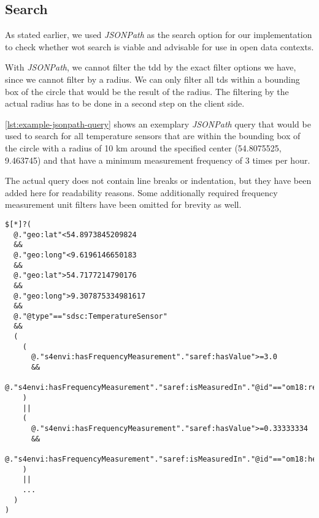 \subsection{Search}\label{sec:search}

As stated earlier, we used \emph{JSONPath} as the search option for our implementation to check whether \gls{wot} search is viable and advisable for use in open data contexts.

With \emph{JSONPath}, we cannot filter the \gls{tdd} by the exact filter options we have, since we cannot filter by a radius. We can only filter all \glspl{td} within a bounding box of the circle that would be the result of the radius. The filtering by the actual radius has to be done in a second step on the client side.

\autoref{lst:example-jsonpath-query} shows an exemplary \emph{JSONPath} query that would be used to search for all temperature sensors that are within the bounding box of the circle with a radius of 10 km around the specified center (54.8075525, 9.463745) and that have a minimum measurement frequency of 3 times per hour.

The actual query does not contain line breaks or indentation, but they have been added here for readability reasons. Some additionally required frequency measurement unit filters have been omitted for brevity as well.

\begin{lstlisting}[language=jsonpath,caption={Example JSONPath query},label={lst:example-jsonpath-query}]
$[*]?(
  @."geo:lat"<54.8973845209824
  &&
  @."geo:long"<9.6196146650183
  &&
  @."geo:lat">54.7177214790176
  &&
  @."geo:long">9.307875334981617
  &&
  @."@type"=="sdsc:TemperatureSensor"
  &&
  (
    (
      @."s4envi:hasFrequencyMeasurement"."saref:hasValue">=3.0
      &&
      @."s4envi:hasFrequencyMeasurement"."saref:isMeasuredIn"."@id"=="om18:reciprocal_hour"
    )
    ||
    (
      @."s4envi:hasFrequencyMeasurement"."saref:hasValue">=0.33333334
      &&
      @."s4envi:hasFrequencyMeasurement"."saref:isMeasuredIn"."@id"=="om18:hertz"
    )
    ||
    ...
  )
)
\end{lstlisting}

